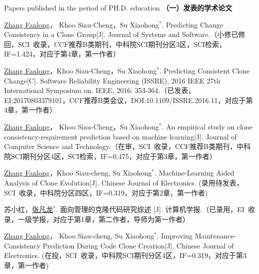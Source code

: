 
 {Papers
published in the period of PH.D. education}
\noindent\textbf{（一）发表的学术论文}
\begin{publist}
\item
\underline{Zhang Fanlong}， Khoo Siau-Cheng，Su Xiaohong{$^*$}. Predicting Change Consistency in a Clone Group[J]. Journal of Systems and Software.（小修已修回，SCI~收录，CCF推荐B类期刊，中科院SCI期刊分区3区，SCI检索，IF=1.424，对应于第4章，第一作者）

\item
\underline{Zhang Fanlong}，Khoo Siau-Cheng，Su Xiaohong{$^*$}. Predicting Consistent Clone Change[C]. Software Reliability Engineering (ISSRE), 2016 IEEE 27th International Symposium on. IEEE, 2016: 353-364.（已发表，EI:20170803379101，CCF推荐B类会议，DOI:10.1109/ISSRE.2016.11，对应于第4章，第一作者）

\item
\underline{Zhang Fanlong}， Khoo Siau-Cheng，Su Xiaohong{$^*$}. An empirical study on clone consistency-requirement prediction based on machine learning[J]. Journal of Computer Science and Technology.（在审，SCI~收录，CCF推荐B类期刊，中科院SCI期刊分区4区，SCI检索，IF=0.475，对应于第3章，第一作者）

\item
\underline{Zhang Fanlong}，Khoo Siau-cheng, Su Xiaohong{$^*$}. Machine-Learning Aided Analysis of Clone Evolution[J]. Chinese Journal of Electronics. (录用待发表，SCI~收录，中科院分区四区，IF=0.319，对应于第2章，第一作者)

\item 
苏小红，\underline{张凡龙}{$^*$}. 面向管理的克隆代码研究综述 [J]. 计算机学报.（已录用，EI~收录，一级学报，对应于第1章，第二作者，导师为第一作者）

\item
\underline{Zhang Fanlong}， Khoo Siau-cheng, Su Xiaohong{$^*$}. Improving Maintenance-Consistency Prediction During Code Clone Creation[J]. Chinese Journal of Electronics. (在投，SCI~收录，中科院SCI期刊分区4区，IF=0.319，对应于第3章，第一作者)


\end{publist}
